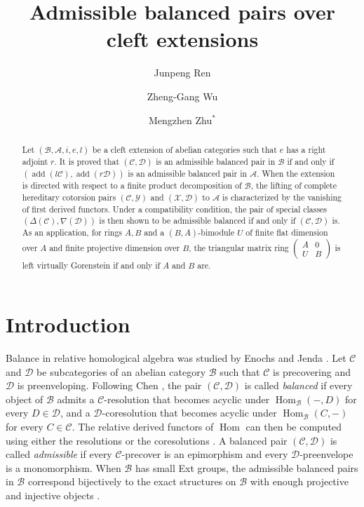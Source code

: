\documentclass[11pt]{amsart}
\title[Balanced pairs over cleft extensions]
{Admissible balanced pairs over cleft extensions}
\author[J. Ren]{Junpeng Ren}
\author[Z.-G. Wu]{Zheng-Gang Wu}
\author[M. Zhu]{Mengzhen Zhu$^{*}$}
\theoremstyle{definition}
\theoremstyle{remark}
\theoremstyle{plain}
\numberwithin{equation}{section}
\begin{document}
\begin{abstract}
	Let $(\mathcal{B}, \mathcal{A}, i, e, l)$ be a cleft extension of abelian categories such that
	$e$ has a right adjoint $r$. It is proved that $(\mathcal{C}, \mathcal{D})$ is an admissible
	balanced pair in $\mathcal{B}$ if and only if
	$(\operatorname{add}(l\mathcal{C}), \operatorname{add}(r\mathcal{D}))$ is an admissible
	balanced pair in $\mathcal{A}$. When the extension is directed with respect to a finite
	product decomposition of $\mathcal{B}$, the lifting of complete hereditary cotorsion pairs
	$(\mathcal{C}, \mathcal{Y})$ and $(\mathcal{X}, \mathcal{D})$ to $\mathcal{A}$ is
	characterized by the vanishing of first derived functors. Under a compatibility condition,
	the pair of special classes $(\Delta(\mathcal{C}), \nabla(\mathcal{D}))$ is then shown to be
	admissible balanced if and only if $(\mathcal{C}, \mathcal{D})$ is.
	As an application, for rings $A, B$ and a $(B, A)$-bimodule $U$ of finite flat dimension
	over $A$ and finite projective dimension over $B$, the triangular matrix ring
	$\left(\begin{smallmatrix}A & 0\\ U & B\end{smallmatrix}\right)$ is left virtually
	Gorenstein if and only if $A$ and $B$ are.
\end{abstract}




\maketitle

\section{Introduction}\label{sec:intro}

Balance in relative homological algebra was studied by Enochs and Jenda
\cite{EnochsJenda}. Let $\mathcal{C}$ and $\mathcal{D}$ be subcategories of an abelian
category $\mathcal{B}$ such that $\mathcal{C}$ is precovering and $\mathcal{D}$ is preenveloping.
Following Chen \cite{Chen}, the pair $(\mathcal{C}, \mathcal{D})$ is called \emph{balanced}
if every object of $\mathcal{B}$ admits a $\mathcal{C}$-resolution that becomes acyclic
under $\operatorname{Hom}_{\mathcal{B}}(-, D)$ for every $D \in \mathcal{D}$, and a $\mathcal{D}$-coresolution that
becomes acyclic under $\operatorname{Hom}_{\mathcal{B}}(C, -)$ for every $C \in \mathcal{C}$. The relative
derived functors of $\operatorname{Hom}$ can then be computed using either the
resolutions or the coresolutions \cite[Lemma~2.1]{Chen}. A balanced pair $(\mathcal{C}, \mathcal{D})$ is called \emph{admissible}
if every $\mathcal{C}$-precover is an epimorphism and every $\mathcal{D}$-preenvelope is a
monomorphism. When $\mathcal{B}$ has small Ext groups, the admissible balanced pairs in $\mathcal{B}$
correspond bijectively to the exact structures on $\mathcal{B}$ with enough
projective and injective objects \cite{WangLiHuang}.
\end{document}
